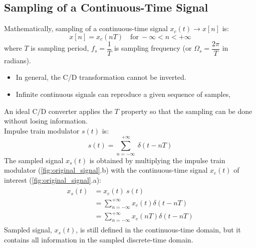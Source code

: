 \subsection{Sampling of a Continuous-Time Signal}
Mathematically, sampling of a continuous-time signal $x_{c}(t) \to x[n]$ is:
\[ x[n] = x_{c}(nT) \quad \text{for} \ -\infty < n < +\infty \]
where $T$ is sampling period, $f_{s} = \dfrac{1}{T}$ is sampling frequency (or $\Omega_{s}=\dfrac{2\pi}{T}$ in radians). 
\begin{itemize}
    \item In general, the C/D transformation cannot be inverted.
    \item Infinite continuous signals can reproduce a given sequence of samples,
\end{itemize}
An ideal C/D converter applies the $T$ property so that the sampling can be done without losing information. \\


Impulse train modulator $s(t)$ is: 
\[ 
    s(t) = \sum_{n=-\infty}^{+\infty} \ \delta(t-nT) 
\]
The sampled signal $x_{s}(t)$ is obtained by multiplying the impulse train modulator (\autoref{fig:original_signal}.b) with the continuous-time signal $x_{c}(t)$ of interest (\autoref{fig:original_signal}.a):
\begin{align*} 
\begin{split}
x_{s}(t) &= x_{c}(t) \ s(t)\\
&= \sum_{n=-\infty}^{+\infty} x_{c}(t) \delta(t-nT)\\
&= \sum_{n=-\infty}^{+\infty} x_{c}(nT) \delta(t-nT)
\end{split}
\end{align*}
Sampled signal, $x_{s}(t)$, is still defined in the continuous-time domain, but it contains all information in the sampled discrete-time domain.\\\\

